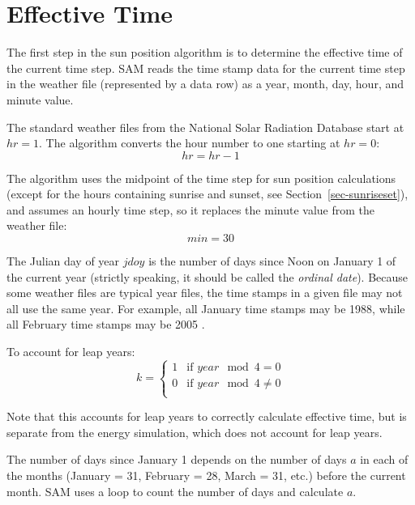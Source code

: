 \documentclass[12pt,letterpaper]{article}
\begin{document}
\section{Effective Time}

The first step in the sun position algorithm is to determine the effective time of the current time step. SAM reads the time stamp data for the current time step in the weather file (represented by a data row) as a year, month, day, hour, and minute value. %

The standard weather files from the National Solar Radiation Database \citep{nsrdb} start at $hr=1$. The algorithm converts the hour number to one starting at $hr=0$: 
\begin{equation}
hr=hr-1
\end{equation}

The algorithm uses the midpoint of the time step for sun position calculations (except for the hours containing sunrise and sunset, see Section~\ref{sec-sunriseset}), and assumes an hourly time step, so it replaces the minute value from the weather file: %
\begin{equation}\label{eqn-mn30}
\mathit{min} =30
\end{equation}

The Julian day of year $\mathit{jdoy}$ is the number of days since Noon on January 1 of the current year (strictly speaking, it should be called the \textit{ordinal date}). Because some weather files are typical year files, the time stamps in a given file may not all use the same year. For example, all January time stamps may be 1988, while all February time stamps may be 2005 \citep{tmy3}.

To account for leap years:
\begin{equation}
k = 
\left\{
   \begin{array}{ll}
      1 & \text{if $\mathit{year}\mod4=0$}\\
      0 & \text{if $\mathit{year}\mod4\neq0$}\\
   \end{array}
\right. 
\end{equation}

Note that this accounts for leap years to correctly calculate effective time, but is separate from the energy simulation, which does not account for leap years.

The number of days since January 1 depends on the number of days $a$ in each of the months (January = 31, February = 28, March = 31, etc.) before the current month. SAM uses a loop to count the number of days and calculate $a$.
\end{document}
